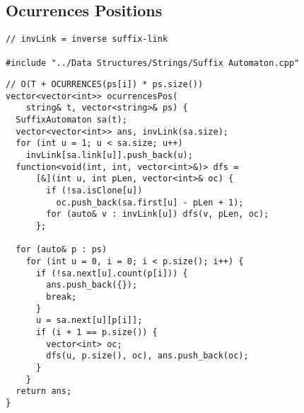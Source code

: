 \documentclass[twoside]{article}
\begin{document}
\begin{multicols*}{2}
\subsectionfont{\large\bfseries\sffamily\underline}
\subsection*{Ocurrences Positions}
\begin{verbatim}
// invLink = inverse suffix-link

#include "../Data Structures/Strings/Suffix Automaton.cpp"
\end{verbatim}
\vspace{-12pt}
\begin{verbatim}
// O(T + OCURRENCES(ps[i]) * ps.size())
vector<vector<int>> ocurrencesPos(
    string& t, vector<string>& ps) {
  SuffixAutomaton sa(t);
  vector<vector<int>> ans, invLink(sa.size);
  for (int u = 1; u < sa.size; u++)
    invLink[sa.link[u]].push_back(u);
  function<void(int, int, vector<int>&)> dfs =
      [&](int u, int pLen, vector<int>& oc) {
        if (!sa.isClone[u])
          oc.push_back(sa.first[u] - pLen + 1);
        for (auto& v : invLink[u]) dfs(v, pLen, oc);
      };

  for (auto& p : ps)
    for (int u = 0, i = 0; i < p.size(); i++) {
      if (!sa.next[u].count(p[i])) {
        ans.push_back({});
        break;
      }
      u = sa.next[u][p[i]];
      if (i + 1 == p.size()) {
        vector<int> oc;
        dfs(u, p.size(), oc), ans.push_back(oc);
      }
    }
  return ans;
}
\end{verbatim}

\subsectionfont{\large\bfseries\sffamily\underline}

\end{multicols*}
\end{document}
